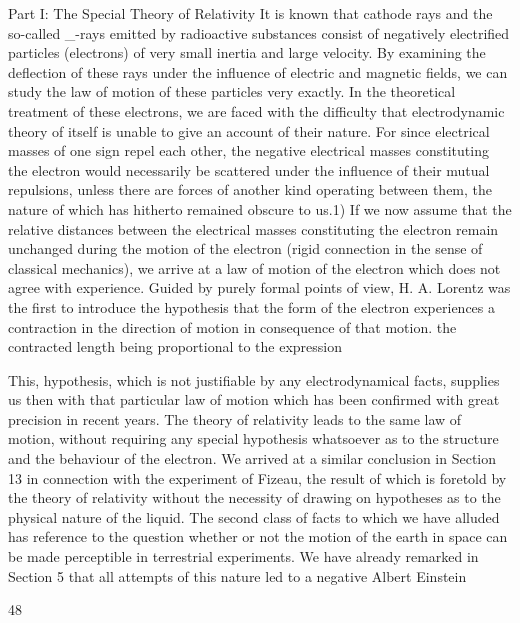 \documentclass{article}
\begin{document}
Part I: The Special Theory of Relativity
It is known that cathode rays and the so-called \_-rays emitted by radioactive substances
consist of negatively electrified particles (electrons) of very small inertia and large velocity.
By examining the deflection of these rays under the influence of electric and magnetic
fields, we can study the law of motion of these particles very exactly.
In the theoretical treatment of these electrons, we are faced with the difficulty that
electrodynamic theory of itself is unable to give an account of their nature. For since
electrical masses of one sign repel each other, the negative electrical masses constituting the
electron would necessarily be scattered under the influence of their mutual repulsions,
unless there are forces of another kind operating between them, the nature of which has
hitherto remained obscure to us.1) If we now assume that the relative distances between the
electrical masses constituting the electron remain unchanged during the motion of the
electron (rigid connection in the sense of classical mechanics), we arrive at a law of motion
of the electron which does not agree with experience. Guided by purely formal points of
view, H. A. Lorentz was the first to introduce the hypothesis that the form of the electron
experiences a contraction in the direction of motion in consequence of that motion. the
contracted length being proportional to the expression

This, hypothesis, which is not justifiable by any electrodynamical facts, supplies us then
with that particular law of motion which has been confirmed with great precision in recent
years.
The theory of relativity leads to the same law of motion, without requiring any special
hypothesis whatsoever as to the structure and the behaviour of the electron. We arrived at a
similar conclusion in Section 13 in connection with the experiment of Fizeau, the result of
which is foretold by the theory of relativity without the necessity of drawing on hypotheses
as to the physical nature of the liquid.
The second class of facts to which we have alluded has reference to the question whether
or not the motion of the earth in space can be made perceptible in terrestrial experiments.
We have already remarked in Section 5 that all attempts of this nature led to a negative
Albert Einstein

48
\end{document}
